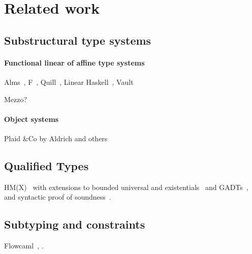 \section{Related work}

\subsection{Substructural type systems}

\paragraph{Functional linear of affine type systems}

Alms~\citep{DBLP:conf/popl/TovP11},
F\degree~\citep{DBLP:conf/tldi/MazurakZZ10},
Quill~\citep{DBLP:conf/icfp/Morris16},
Linear Haskell~\citep{DBLP:journals/pacmpl/BernardyBNJS18},
Vault\citep{DBLP:conf/pldi/DeLineF01,DBLP:conf/pldi/FahndrichD02}

Mezzo?

\paragraph{Object systems}
\TODO{}

Plaid \&Co by Aldrich and others

\subsection{Qualified Types}

HM(X)~\citep{DBLP:journals/tapos/OderskySW99} with extensions to
bounded universal and existentials~\citep{DBLP:conf/icfp/Simonet03}
and GADTs~\citep{DBLP:journals/toplas/SimonetP07},
and syntactic proof of soundness~\citep{DBLP:journals/entcs/SkalkaP02}.

\subsection{Subtyping and constraints}

Flowcaml~\citep{DBLP:conf/popl/PottierS02},
\citet{DBLP:conf/sas/TrifonovS96}.


